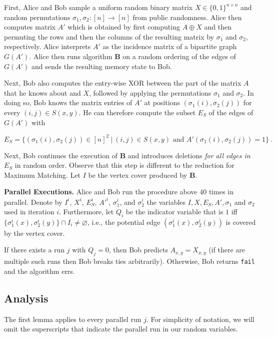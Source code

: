 First, Alice and Bob sample a uniform random binary matrix $X \in \{0,1\}^{n \times n}$ and random permutations 
$\sigma_1, \sigma_2: [n] \rightarrow [n]$ from public randomness. 
Alice then computes matrix $A'$ which is obtained by first computing $A \oplus X$
and then  permuting the rows and then the columns of the resulting matrix by $\sigma_1$ and $\sigma_2$, respectively. 
Alice interprets $A'$ as the incidence matrix of a bipartite graph $G(A')$. Alice then runs algorithm $\mathbf{B}$ 
on a random ordering of the edges of $G(A')$ and sends the resulting memory state to Bob.

Next, Bob also computes the entry-wise XOR between the part of the matrix $A$ that he knows about and $X$, followed by applying
the permutations $\sigma_1$ and $\sigma_2$. In doing so, Bob knows the matrix entries of $A'$ at positions 
$(\sigma_1(i), \sigma_2(j))$
for every $(i,j) \in S(x,y)$. He can therefore compute the subset $E_S$ of the edges of $G(A')$ with

$$E_S = \{(\sigma_1(i),\sigma_2(j)) \in [n]^2 \ | \ (i,j) \in S(x,y) \mbox{ and } A'(\sigma_1(i),\sigma_2(j)) = 1  \} \ .$$

Next, Bob continues the execution of $\mathbf{B}$ and introduces deletions {\em for all edges in $E_S$} in random order. 
Observe that this 
step is different to the reduction for \textsf{Maximum Matching}. Let $I$ be the vertex cover produced by $\mathbf{B}$.
%

\textbf{Parallel Executions.} Alice and Bob run the procedure above $40$ times in parallel. Denote by $I^i$, $X^i$, $E^i_S$,
$A'^i$, $\sigma_1^i$, and $\sigma_2^i$ the variables $I, X, E_S, A', \sigma_1$ and $\sigma_2$ used in iteration $i$.  
Furthermore, let $Q_i$ be 
the indicator variable that is $1$ iff $\{ \sigma^i_1(x), \sigma^i_2(y) \} \cap I_i \neq \varnothing$,
i.e., the potential edge $(\sigma^i_1(x), \sigma^i_2(y))$ is covered by the vertex cover. 

If there exists a run $j$ with $Q_j = 0$, then Bob predicts $A_{x,y} = X_{x,y}$ (if there are multiple such runs
then Bob breaks ties arbitrarily). Otherwise, Bob returns \texttt{fail} and the algorithm errs.

\subsection{Analysis}
%
%
%
%
%
%

The first lemma applies to every parallel run $j$. For simplicity of notation, we will omit
the superscripts that indicate the parallel run in our random variables.

